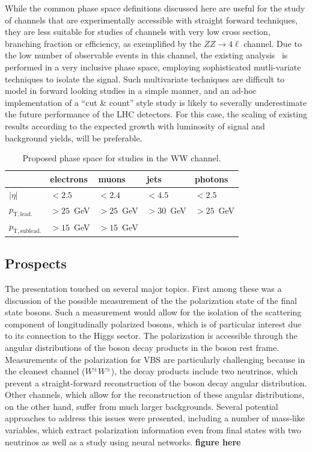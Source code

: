 While the common phase space definitions discussed here are useful for the study of channels that are experimentally accessible with straight forward techniques, they are less suitable for studies of channels with very low cross section, branching fraction or efficiency, as exemplified by the $ZZ\rightarrow 4\ell$ channel. Due to the low number of observable events in this channel, the existing analysis~\cite{CMS-PAS-SMP-17-006} is performed in a very inclusive phase space, employing sophisticated mutli-variate techniques to isolate the signal. Such multivariate techniques are difficult to model in forward looking studies in a simple manner, and an ad-hoc implementation of a  ``cut \& count'' style study is likely to severally underestimate the future performance of the LHC detectors. For this case, the scaling of existing results according to the expected growth with luminosity of signal and background yields, will be preferable.

\begin{table}[htb]
\centering
\begin{tabular}{|l|l|l|l|l|}
    \hline
             & electrons & muons & jets & photons \\
    \hline
    $|\eta|$ & $<2.5$  & $<2.4$ & $<4.5$ & $<2.5$ \\
    $p_\mathrm{T,lead.}$ & $>25$~GeV & $>25$~GeV &$>30$~GeV &$>25$~GeV\\
    $p_\mathrm{T,sublead.}$ & $>15$~GeV & $>15$~GeV &&\\                            
    \hline
  \end{tabular}  

\caption{\label{tab:wg2:phasespace} Proposed phase space for studies in the WW channel.}
\end{table}

\subsection{Prospects}

The presentation touched on several major topics. First among these was a discussion of the possible measurement of the the polarization state of the final state bosons.
Such a measurement would allow for the isolation of the scattering component of longitudinally polarized bosons, which is of particular interest due to its connection to the Higgs sector.
The polarization is accessible through the angular distributions of the boson decay products in the boson rest frame. 
Measurements of the polarization for VBS are particularly challenging because in the cleanest channel ($W^\pm W^\pm$), the decay products include two neutrinos, which prevent a straight-forward reconstruction of the boson decay angular distribution. Other channels, which allow for the reconstruction of these angular distributions, on the other hand, suffer from much larger backgrounds. Several potential approaches to address this issues were presented, including a number of mass-like variables, which extract polarization information even from final states with two neutrinos as well as a study using neural networks. \textbf{figure here}

